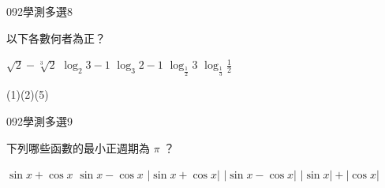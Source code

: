 \begin{QUESTIONS}
    \begin{QUESTION}
        \begin{ExamInfo}{092}{學測}{多選}{8}
        \end{ExamInfo}
        \begin{ExamAnsRateInfo}{55}{86}{60}{19}
        \end{ExamAnsRateInfo}
        \begin{QBODY}
            以下各數何者為正？ 
            \begin{QOPS} 
                \QOP $\sqrt{2} - \sqrt[3]{2}$ 
                \QOP $\log_{2} 3-1$ 
                \QOP $\log_{3}2 -1$ 
                \QOP $\log_{\frac{1}{2}} 3$ 
                \QOP $\log_{\frac{1}{3}} \frac{1}{2}$ 
            \end{QOPS}
        \end{QBODY}
        \begin{QFROMS}
        \end{QFROMS}
        \begin{QTAGS}\end{QTAGS}
        \begin{QANS}
            (1)(2)(5)
        \end{QANS}
        \begin{QSOLLIST}
        \end{QSOLLIST}
        \begin{QEMPTYSPACE}
        \end{QEMPTYSPACE}
    \end{QUESTION}
    \begin{QUESTION}
        \begin{ExamInfo}{092}{學測}{多選}{9}
        \end{ExamInfo}
        \begin{ExamAnsRateInfo}{24}{42}{19}{11}
        \end{ExamAnsRateInfo}
        \begin{QBODY}
            下列哪些函數的最小正週期為 $\pi$ ？ 
            \begin{QOPS} 
                \QOP $\sin x + \cos x$ 
                \QOP $\sin x - \cos x$ 
                \QOP $|\sin x + \cos x|$
                \QOP $|\sin x - \cos x|$ 
                \QOP $|\sin x| + |\cos x|$
            \end{QOPS}
        \end{QBODY}
        \begin{QFROMS}
        \end{QFROMS}
        \begin{QTAGS}\end{QTAGS}

\end{QUESTION}
\end{QUESTIONS}

